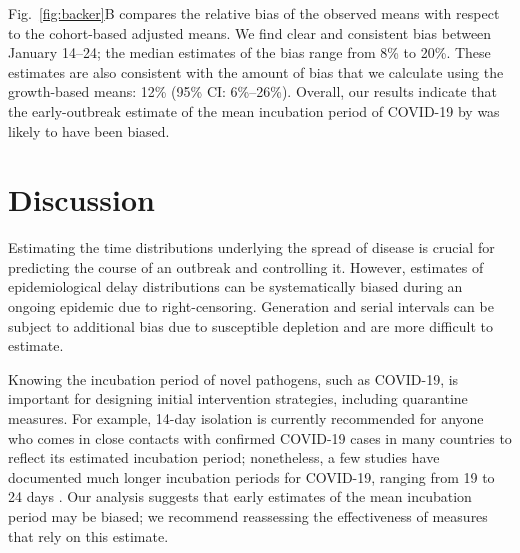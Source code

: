 \documentclass[12pt]{article}
\newcommand{\fref}[1]{Fig.~\ref{fig:#1}}
\begin{document}
\fref{backer}B compares the relative bias of the observed means with respect to the cohort-based adjusted means.
We find clear and consistent bias between January 14--24;
the median estimates of the bias range from 8\% to 20\%.
These estimates are also consistent with the amount of bias that we calculate using the growth-based means: 12\% (95\% CI: 6\%--26\%).
Overall, our results indicate that the early-outbreak estimate of the mean incubation period of COVID-19 by \cite{backer2020incubation} was likely to have been biased.


\section{Discussion}

Estimating the time distributions underlying the spread of disease is crucial for predicting the course of an outbreak and controlling it.
However, estimates of epidemiological delay distributions can be systematically biased during an ongoing epidemic due to right-censoring.
Generation and serial intervals can be subject to additional bias due to susceptible depletion and are more difficult to estimate.

Knowing the incubation period of novel pathogens, such as COVID-19, is important for designing initial intervention strategies, including quarantine measures.
For example, 14-day isolation is currently recommended for anyone who comes in close contacts with confirmed COVID-19 cases in many countries to reflect its estimated incubation period;
nonetheless, a few studies have documented much longer incubation periods for COVID-19, ranging from 19 to 24 days \citep{bai2020presumed, guan2020clinical}.
Our analysis suggests that early estimates of the mean incubation period may be biased;
we recommend reassessing the effectiveness of measures that rely on this estimate.
\end{document}
